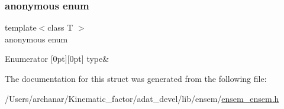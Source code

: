 \subsubsection{\texorpdfstring{anonymous enum}{anonymous enum}}
{\footnotesize\ttfamily template$<$class T $>$ \\
anonymous enum}

\begin{DoxyEnumFields}{Enumerator}
[0pt][0pt]{}\mbox{\label{structENSEM_1_1EnsbcIO_3_01EScalar_3_01T_01_4_01_4_ac646de0b09040fbe5aa03939f2ca71fba91b43cfd0a234b7ecf01fb42ee56c00b}} 
type&\\
\hline

\end{DoxyEnumFields}


The documentation for this struct was generated from the following file\+:\begin{DoxyCompactItemize}
\item 
/\+Users/archanar/\+Kinematic\+\_\+factor/adat\+\_\+devel/lib/ensem/\mbox{\hyperlink{lib_2ensem_2ensem__ensem_8h}{ensem\+\_\+ensem.\+h}}\end{DoxyCompactItemize}
